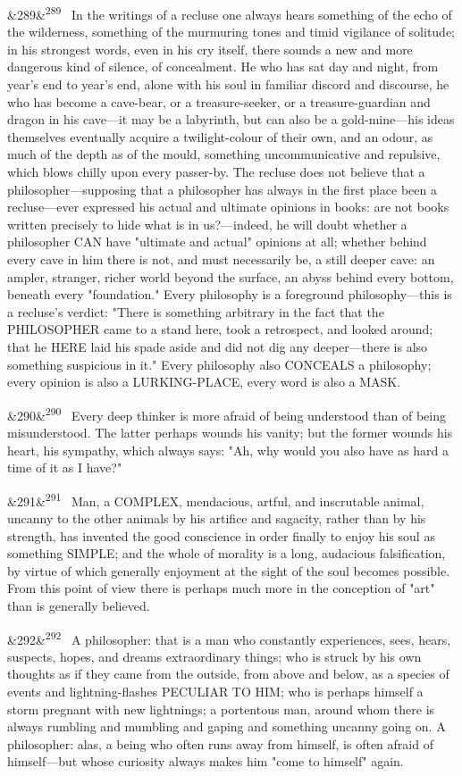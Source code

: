 \documentclass[12pt]{article}
\newcommand{\para}[1][]{\par\noindent\ifx&#1&\else\textsuperscript{\footnotesize #1}~\fi}
\begin{document}
\para[289] In the writings of a recluse one always hears something of the echo of the wilderness, something of the murmuring tones and timid vigilance of solitude; in his strongest words, even in his cry itself, there sounds a new and more dangerous kind of silence, of concealment. He who has sat day and night, from year's end to year's end, alone with his soul in familiar discord and discourse, he who has become a cave-bear, or a treasure-seeker, or a treasure-guardian and dragon in his cave---it may be a labyrinth, but can also be a gold-mine---his ideas themselves eventually acquire a twilight-colour of their own, and an odour, as much of the depth as of the mould, something uncommunicative and repulsive, which blows chilly upon every passer-by. The recluse does not believe that a philosopher---supposing that a philosopher has always in the first place been a recluse---ever expressed his actual and ultimate opinions in books: are not books written precisely to hide what is in us?---indeed, he will doubt whether a philosopher CAN have "ultimate and actual" opinions at all; whether behind every cave in him there is not, and must necessarily be, a still deeper cave: an ampler, stranger, richer world beyond the surface, an abyss behind every bottom, beneath every "foundation." Every philosophy is a foreground philosophy---this is a recluse's verdict: "There is something arbitrary in the fact that the PHILOSOPHER came to a stand here, took a retrospect, and looked around; that he HERE laid his spade aside and did not dig any deeper---there is also something suspicious in it." Every philosophy also CONCEALS a philosophy; every opinion is also a LURKING-PLACE, every word is also a MASK.

\para[290] Every deep thinker is more afraid of being understood than of being misunderstood. The latter perhaps wounds his vanity; but the former wounds his heart, his sympathy, which always says: "Ah, why would you also have as hard a time of it as I have?"

\para[291] Man, a COMPLEX, mendacious, artful, and inscrutable animal, uncanny to the other animals by his artifice and sagacity, rather than by his strength, has invented the good conscience in order finally to enjoy his soul as something SIMPLE; and the whole of morality is a long, audacious falsification, by virtue of which generally enjoyment at the sight of the soul becomes possible. From this point of view there is perhaps much more in the conception of "art" than is generally believed.

\para[292] A philosopher: that is a man who constantly experiences, sees, hears, suspects, hopes, and dreams extraordinary things; who is struck by his own thoughts as if they came from the outside, from above and below, as a species of events and lightning-flashes PECULIAR TO HIM; who is perhaps himself a storm pregnant with new lightnings; a portentous man, around whom there is always rumbling and mumbling and gaping and something uncanny going on. A philosopher: alas, a being who often runs away from himself, is often afraid of himself---but whose curiosity always makes him "come to himself" again.
\end{document}
